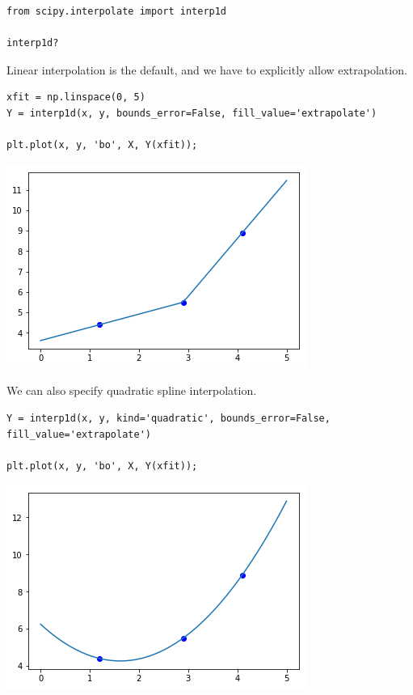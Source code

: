 \documentclass[11pt]{article}
\begin{document}
\begin{verbatim}
from scipy.interpolate import interp1d

interp1d?
\end{verbatim}

Linear interpolation is the default, and we have to explicitly allow extrapolation.

\begin{verbatim}
xfit = np.linspace(0, 5)
Y = interp1d(x, y, bounds_error=False, fill_value='extrapolate')

plt.plot(x, y, 'bo', X, Y(xfit));
\end{verbatim}

\begin{center}
\includegraphics[width=.9\linewidth]{obipy-resources/e021eb5cde8c0f560ad245cab4a1f678-55929XN1.png}
\end{center}

We can also specify quadratic spline interpolation.

\begin{verbatim}
Y = interp1d(x, y, kind='quadratic', bounds_error=False, fill_value='extrapolate')

plt.plot(x, y, 'bo', X, Y(xfit));
\end{verbatim}

\begin{center}
\includegraphics[width=.9\linewidth]{obipy-resources/e021eb5cde8c0f560ad245cab4a1f678-55929JXE.png}
\end{center}
\end{document}
